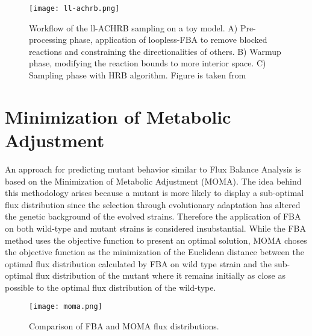 \begin{figure}[H]
\begin{center}
\texttt{[image: ll-achrb.png]}
\end{center}
\caption[Workflow of the Loopless-ACHRB sampling on a toy model]{Workflow of the ll-ACHRB sampling on a toy model. A) Pre-processing phase, application of loopless-FBA to remove blocked reactions and constraining the directionalities of others. B) Warmup phase, modifying the reaction bounds to more interior space. C) Sampling phase with HRB algorithm. Figure is taken from \cite{saa2016ll}}
\label{fig:achrb}
\end{figure}


\section{Minimization of Metabolic Adjustment}
An approach for predicting mutant behavior similar to Flux Balance Analysis is based on the Minimization of Metabolic Adjustment (MOMA). The idea behind this methodology arises because a mutant is more likely to display a sub-optimal flux distribution since the selection through evolutionary adaptation has altered the genetic background of the evolved strains. Therefore the application of FBA on both wild-type and mutant strains is considered insubstantial. While the FBA method uses the objective function to present an optimal solution, MOMA choses the objective function as the minimization of the Euclidean distance between the optimal flux distribution calculated by FBA on wild type strain and the sub-optimal flux distribution of the mutant where it remains initially as close as possible to the optimal flux distribution of the wild-type.

\begin{figure}[H]
\begin{center}
\texttt{[image: moma.png]}
\caption[Comparison of FBA and MOMA flux distributions]{Comparison of FBA and MOMA flux distributions.}
\end{center}
\label{fig:moma}
\end{figure}
\noindent

